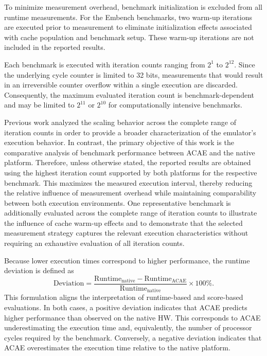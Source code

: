 \documentclass[conference]{IEEEtran}
\begin{document}
			To minimize measurement overhead, benchmark initialization is excluded from all runtime measurements.
			For the Embench benchmarks, two warm-up iterations are executed prior to measurement to eliminate initialization effects associated with cache population and benchmark setup.
			These warm-up iterations are not included in the reported results.
			
			Each benchmark is executed with iteration counts ranging from $2^{1}$ to $2^{12}$.
			Since the underlying cycle counter is limited to 32 bits, measurements that would result in an irreversible counter overflow within a single execution are discarded.
			Consequently, the maximum evaluated iteration count is benchmark-dependent and may be limited to $2^{11}$ or $2^{10}$ for computationally intensive benchmarks.
			
			Previous work analyzed the scaling behavior across the complete range of iteration counts in order to provide a broader characterization of the emulator's execution behavior.
			In contrast, the primary objective of this work is the comparative analysis of benchmark performance between \ac{ACAE} and the native platform.
			Therefore, unless otherwise stated, the reported results are obtained using the highest iteration count supported by both platforms for the respective benchmark.
			This maximizes the measured execution interval, thereby reducing the relative influence of measurement overhead while maintaining comparability between both execution environments.
			One representative benchmark is additionally evaluated across the complete range of iteration counts to illustrate the influence of cache warm-up effects and to demonstrate that the selected measurement strategy captures the relevant execution characteristics without requiring an exhaustive evaluation of all iteration counts.
			
			Because lower execution times correspond to higher performance, the runtime deviation is defined as
			\begin{equation}
				\label{eq:runtime_deviation}
				\mathrm{Deviation} =
				\frac{\mathrm{Runtime}_{\mathrm{native}} -
					\mathrm{Runtime}_{\mathrm{ACAE}}}
					{\mathrm{Runtime}_{\mathrm{native}}}
				\times 100\%.
			\end{equation}
			\noindent
			This formulation aligns the interpretation of runtime-based and score-based evaluations.
			In both cases, a positive deviation indicates that \ac{ACAE} predicts higher performance than observed on the native \ac{HW}.
			This corresponds to \ac{ACAE} underestimating the execution time and, equivalently, the number of processor cycles required by the benchmark.
			Conversely, a negative deviation indicates that \ac{ACAE} overestimates the execution time relative to the native platform.
\end{document}
